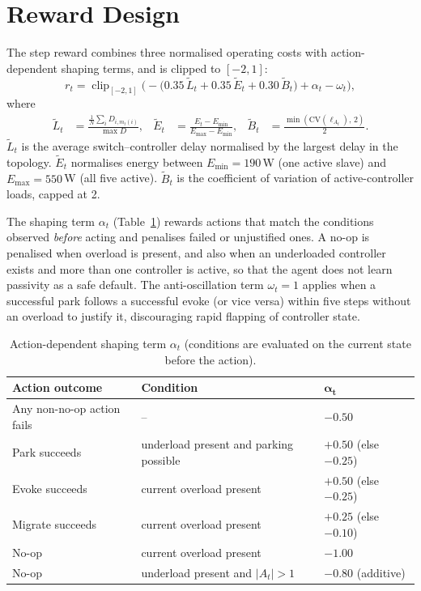 \section{Reward Design}
\label{sec:reward}

The step reward combines three normalised operating costs with action-dependent shaping terms, and is clipped to $[-2,1]$:
\begin{equation}
  r_t=\operatorname{clip}_{[-2,1]}\Big(-\big(0.35\,\tilde L_t+0.35\,\tilde E_t+0.30\,\tilde B_t\big)+\alpha_t-\omega_t\Big),
  \label{eq:reward}
\end{equation}
where
\begin{align}
  \tilde L_t &= \frac{\frac{1}{N}\sum_i D_{i,m_t(i)}}{\max D}, &
  \tilde E_t &= \frac{E_t-E_{\min}}{E_{\max}-E_{\min}}, &
  \tilde B_t &= \frac{\min(\mathrm{CV}(\bm{\ell}_{A_t}),\,2)}{2}.
\end{align}
$\tilde L_t$ is the average switch--controller delay normalised by the largest delay in the topology. $\tilde E_t$ normalises energy between $E_{\min}=190$\,W (one active slave) and $E_{\max}=550$\,W (all five active). $\tilde B_t$ is the coefficient of variation of active-controller loads, capped at 2.

The shaping term $\alpha_t$ (Table~\ref{tab:shaping}) rewards actions that match the conditions observed \emph{before} acting and penalises failed or unjustified ones. A no-op is penalised when overload is present, and also when an underloaded controller exists and more than one controller is active, so that the agent does not learn passivity as a safe default. The anti-oscillation term $\omega_t=1$ applies when a successful park follows a successful evoke (or vice versa) within five steps without an overload to justify it, discouraging rapid flapping of controller state.

\begin{table}[htbp]
\centering
\caption{Action-dependent shaping term $\alpha_t$ (conditions are evaluated on the current state before the action).}
\label{tab:shaping}
\small
\begin{tabular}{@{}lll@{}}
\toprule
\textbf{Action outcome} & \textbf{Condition} & $\bm{\alpha_t}$\\
\midrule
Any non-no-op action fails & -- & $-0.50$\\
Park succeeds & underload present and parking possible & $+0.50$ (else $-0.25$)\\
Evoke succeeds & current overload present & $+0.50$ (else $-0.25$)\\
Migrate succeeds & current overload present & $+0.25$ (else $-0.10$)\\
No-op & current overload present & $-1.00$\\
No-op & underload present and $|A_t|>1$ & $-0.80$ (additive)\\
\bottomrule
\end{tabular}
\end{table}

